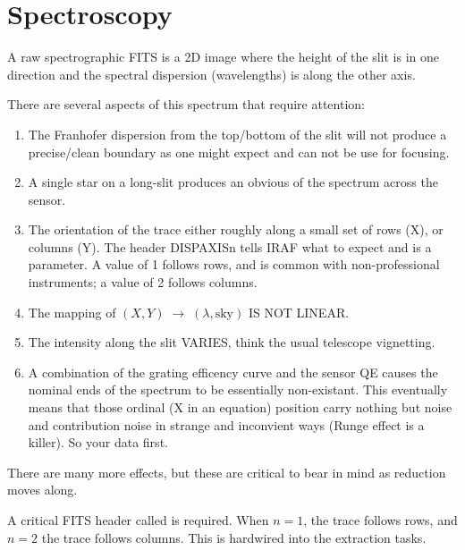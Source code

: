 \renewcommand{\footerfilename}{Spectroscopy.tex}

\section{Spectroscopy}

A raw spectrographic FITS is a 2D image where the height of the slit is in
one direction and the spectral dispersion (wavelengths) is along the
other axis.

There are several aspects of this spectrum that require attention:
\vspace{-.15cm}
\begin{enumerate}\addtolength{\itemsep}{-0.5\baselineskip}
   \item   The Franhofer dispersion from the top/bottom of the slit will not
produce a precise/clean boundary as one might expect and can not be
use for focusing.
   \item   A single star on a long-slit produces an obvious  of the spectrum
across the sensor.
   \item   The orientation of the trace either roughly along a small set of rows (X),
or columns (Y). The header DISPAXISn tells IRAF what to expect and is
a  parameter. A value of 1 follows rows, and is common with
non-professional instruments; a value of 2 follows columns. 
   \item   The mapping of $(X,Y)\;\rightarrow\;(\lambda,\textrm{sky})$ IS NOT LINEAR.
   \item   The intensity along the slit VARIES, think the usual telescope vignetting.
   \item   A combination of the grating efficency curve and the sensor QE causes the
nominal ends of the spectrum to be essentially non-existant. This eventually
means that those ordinal (X in an equation) position carry nothing but noise
and contribution noise in strange and inconvient ways (Runge effect is a killer).
So  your data first. 
\end{enumerate}

There are many more effects, but these are critical to bear in mind as reduction
moves along.

A critical FITS header called  is required. When $n=1$, the
trace follows rows, and $n=2$ the trace follows columns. This is hardwired
into the extraction tasks.

